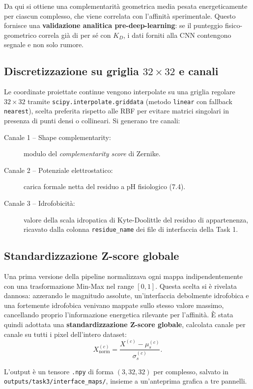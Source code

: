 \documentclass[11pt,a4paper]{article}
\begin{document}
Da qui si ottiene una complementarità geometrica media pesata energeticamente per ciascun complesso, che viene correlata con l'affinità sperimentale. Questo fornisce una \textbf{validazione analitica pre-deep-learning}: se il punteggio fisico-geometrico correla già di per sé con $K_D$, i dati forniti alla CNN contengono segnale e non solo rumore.

\subsection{Discretizzazione su griglia $32\times32$ e canali}
Le coordinate proiettate continue vengono interpolate su una griglia regolare $32\times32$ tramite \texttt{scipy.interpolate.griddata} (metodo \texttt{linear} con fallback \texttt{nearest}), scelta preferita rispetto alle RBF per evitare matrici singolari in presenza di punti densi o collineari. Si generano tre canali:
\begin{description}
    \item[Canale 1 -- Shape complementarity:] modulo del \emph{complementarity score} di Zernike.
    \item[Canale 2 -- Potenziale elettrostatico:] carica formale netta del residuo a pH fisiologico (7.4).
    \item[Canale 3 -- Idrofobicità:] valore della scala idropatica di Kyte-Doolittle del residuo di appartenenza, ricavato dalla colonna \texttt{residue\_name} dei file di interfaccia della Task 1.
\end{description}

\subsection{Standardizzazione Z-score globale}
Una prima versione della pipeline normalizzava ogni mappa indipendentemente con una trasformazione Min-Max nel range $[0,1]$. Questa scelta si è rivelata dannosa: azzerando le magnitudo assolute, un'interfaccia debolmente idrofobica e una fortemente idrofobica venivano mappate sullo stesso valore massimo, cancellando proprio l'informazione energetica rilevante per l'affinità. È stata quindi adottata una \textbf{standardizzazione Z-score globale}, calcolata canale per canale su tutti i pixel dell'intero dataset:
\[
X^{(c)}_{\text{norm}} = \frac{X^{(c)} - \mu^{(c)}_s}{\sigma^{(c)}_s}.
\]

L'output è un tensore \texttt{.npy} di forma $(3,32,32)$ per complesso, salvato in \texttt{outputs/task3/interface\_maps/}, insieme a un'anteprima grafica a tre pannelli.
\end{document}
